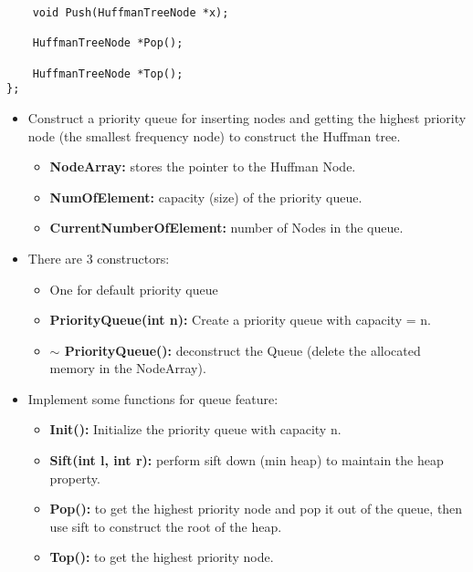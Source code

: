 \begin{enumerate}[label=\textbf{\Alph*.}]
\begin{itemize}
\begin{verbatim}
    void Push(HuffmanTreeNode *x);
    
    HuffmanTreeNode *Pop();

    HuffmanTreeNode *Top();
};
\end{verbatim}
        \begin{itemize}
            \item Construct a priority queue for inserting nodes and getting the highest priority node (the smallest frequency node) to construct the Huffman tree.
            \begin{itemize}
                \item \textbf{NodeArray:} stores the pointer to the  Huffman Node.
                \item \textbf{NumOfElement:} capacity (size) of the priority queue.
                \item \textbf{CurrentNumberOfElement:} number of Nodes in the queue.
            \end{itemize}
            \item There are 3 constructors: 
            \begin{itemize}
                \item One for default priority queue
                \item \textbf{PriorityQueue(int n):} Create a priority queue with capacity = n.
                \item \textbf{$\sim$ PriorityQueue():} deconstruct the Queue (delete the allocated memory in the NodeArray).
            \end{itemize}
            \item Implement some functions for queue feature:
            \begin{itemize}
                \item \textbf{Init():} Initialize the priority queue with capacity n.
                \item \textbf{Sift(int l, int r):} perform sift down (min heap) to maintain the heap property.
                \item \textbf{Pop():} to get the highest priority node and pop it out of the queue, then use sift to construct the root of the heap.
                \item \textbf{Top():} to get the highest priority node.
\newpage
\begin{verbatim}

\end{verbatim}
\end{itemize}
\end{itemize}
\end{itemize}
\end{enumerate}
